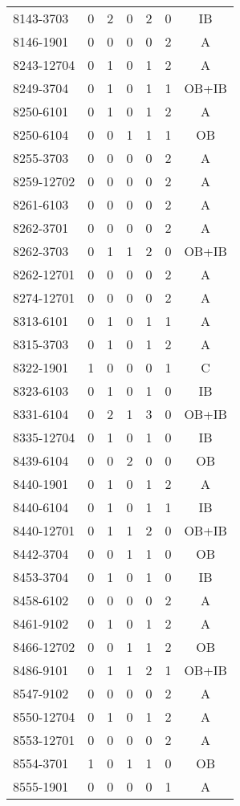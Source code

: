 \begin{longtable}[c]{lcccccc}
8143-3703 & 0 & 2 & 0 & 2 & 0 & IB \\
8146-1901 & 0 & 0 & 0 & 0 & 2 & A \\
8243-12704 & 0 & 1 & 0 & 1 & 2 & A \\
8249-3704 & 0 & 1 & 0 & 1 & 1 & OB+IB \\
8250-6101 & 0 & 1 & 0 & 1 & 2 & A \\
8250-6104 & 0 & 0 & 1 & 1 & 1 & OB \\
8255-3703 & 0 & 0 & 0 & 0 & 2 & A \\
8259-12702 & 0 & 0 & 0 & 0 & 2 & A \\
8261-6103 & 0 & 0 & 0 & 0 & 2 & A \\
8262-3701 & 0 & 0 & 0 & 0 & 2 & A \\
8262-3703 & 0 & 1 & 1 & 2 & 0 & OB+IB \\
8262-12701 & 0 & 0 & 0 & 0 & 2 & A \\
8274-12701 & 0 & 0 & 0 & 0 & 2 & A \\
8313-6101 & 0 & 1 & 0 & 1 & 1 & A \\
8315-3703 & 0 & 1 & 0 & 1 & 2 & A \\
8322-1901 & 1 & 0 & 0 & 0 & 1 & C \\
8323-6103 & 0 & 1 & 0 & 1 & 0 & IB \\
8331-6104 & 0 & 2 & 1 & 3 & 0 & OB+IB \\
8335-12704 & 0 & 1 & 0 & 1 & 0 & IB \\
8439-6104 & 0 & 0 & 2 & 0 & 0 & OB \\
8440-1901 & 0 & 1 & 0 & 1 & 2 & A \\
8440-6104 & 0 & 1 & 0 & 1 & 1 & IB \\
8440-12701 & 0 & 1 & 1 & 2 & 0 & OB+IB \\
8442-3704 & 0 & 0 & 1 & 1 & 0 & OB \\
8453-3704 & 0 & 1 & 0 & 1 & 0 & IB \\
8458-6102 & 0 & 0 & 0 & 0 & 2 & A \\
8461-9102 & 0 & 1 & 0 & 1 & 2 & A \\
8466-12702 & 0 & 0 & 1 & 1 & 2 & OB \\
8486-9101 & 0 & 1 & 1 & 2 & 1 & OB+IB \\
8547-9102 & 0 & 0 & 0 & 0 & 2 & A \\
8550-12704 & 0 & 1 & 0 & 1 & 2 & A \\
8553-12701 & 0 & 0 & 0 & 0 & 2 & A \\
8554-3701 & 1 & 0 & 1 & 1 & 0 & OB \\
8555-1901 & 0 & 0 & 0 & 0 & 1 & A \\

\end{longtable}
